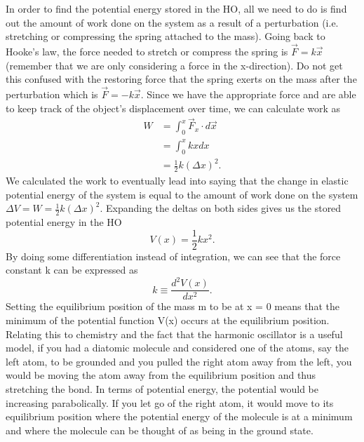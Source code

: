 \documentclass{article}
\newcommand{\be}{\begin{equation}}
\newcommand{\ee}{\end{equation}}
\begin{document}
In order to find the potential energy stored in the HO, all we need to do is find out the amount of work done on the system as a result of a perturbation (i.e. stretching or
compressing the spring attached to the mass). Going back to Hooke's law, the force needed to stretch or compress the spring is $\vec{F} = k \vec{x}$ (remember that we are
only considering a force in the x-direction). Do not get this confused with the restoring force that the spring exerts on the mass after the perturbation which is $\vec{F} = - k \vec{x}$.
Since we have the appropriate force and are able to keep track of the object's displacement over time, we can calculate work as
\be
\begin{split}
W &= \int_{0}^{x} \vec{F}_x \cdot d\vec{x} \\
&= \int_{0}^{x} k x dx \\
&= \frac{1}{2}k (\Delta x)^2 .
\end{split}
\ee
We calculated the work to eventually lead into saying that the change in elastic potential energy of the system is equal to the amount of work done on the system $\Delta V = W = \frac{1}{2}k (\Delta x)^2$. Expanding the deltas on both sides gives us the stored potential energy in the HO
\be
V(x) = \frac{1}{2}k x^2.
\ee
By doing some differentiation instead of integration, we can see that the force constant k can be expressed as
\be
k \equiv \frac{d^2 V(x)}{d x^2}.
\ee
Setting the equilibrium position of the mass m to be at x = 0 means that the minimum of the potential function V(x) occurs at the equilibrium position. 
Relating this to chemistry and the fact that the harmonic oscillator is a useful model, if you had a diatomic molecule and considered one of the atoms, say the left atom, to be grounded and you pulled the right atom away from the left, you would be moving the atom away from the equilibrium position and thus stretching the bond. 
In terms of potential energy, the potential would be increasing parabolically. 
If you let go of the right atom, it would move to its equilibrium position where the potential energy of the molecule is at a minimum and where the molecule can be thought of as being in the ground state.

\end{document}

